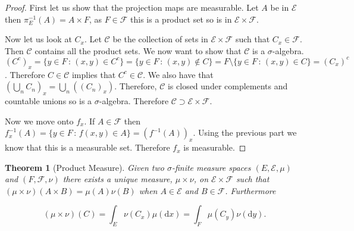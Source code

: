 \documentclass[
]{book}
\newtheorem{theorem}{Theorem}[chapter]
\theoremstyle{definition}
\theoremstyle{definition}
\theoremstyle{definition}
\theoremstyle{definition}
\theoremstyle{remark}
\begin{document}
\begin{proof}
First let us show that the projection maps are measurable. Let \(A\) be in \(\mathcal{E}\) then \(\pi_E^{-1}(A) = A \times F\), as \(F \in \mathcal{F}\) this is a product set so is in \(\mathcal{E} \times \mathcal{F}\).

Now let us look at \(C_x\). Let \(\mathcal{C}\) be the collection of sets in \(\mathcal{E} \times \mathcal{F}\) such that \(C_x \in \mathcal{F}\). Then \(\mathcal{C}\) contains all the product sets. We now want to show that \(\mathcal{C}\) is a \(\sigma\)-algebra. \((C^c)_x = \{ y \in F \,:\, (x,y) \in C^c\} = \{ y \in F \, :\, (x,y) \notin C\} = F \setminus \{ y \in F\,:\, (x,y) \in C\} = (C_x)^c\). Therefore \(C \in \mathcal{C}\) implies that \(C^c \in \mathcal{C}\). We also have that \(\left(\bigcup_n C_n \right)_x = \bigcup_n \left( (C_n)_x \right)\). Therefore, \(\mathcal{C}\) is closed under complements and countable unions so is a \(\sigma\)-algebra. Therefore \(\mathcal{C} \supset \mathcal{E} \times \mathcal{F}\).

Now we move onto \(f_x\). If \(A \in \mathcal{F}\) then \(f_x^{-1}(A) = \{ y \in F \,:\, f(x,y) \in A\} = (f^{-1}(A))_x\). Using the previous part we know that this is a measurable set. Therefore \(f_x\) is measurable.
\end{proof}

\begin{theorem}[Product Measure]
Given two \(\sigma\)-finite measure spaces \((E, \mathcal{E}, \mu)\) and \((F, \mathcal{F}, \nu)\) there exists a unique measure, \(\mu \times \nu\), on \(\mathcal{E} \times \mathcal{F}\) such that \((\mu \times \nu)(A \times B) = \mu(A)\nu(B)\) when \(A \in \mathcal{E}\) and \(B \in \mathcal{F}\). Furthermore

\[ (\mu \times \nu)(C) = \int_E \nu( C_x) \mu(\mathrm{d}x) = \int_F \mu(C_y) \nu(\mathrm{d}y).\]
\end{theorem}
\end{document}
